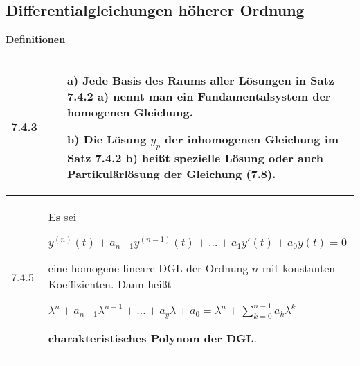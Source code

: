 \subsection{Differentialgleichungen höherer Ordnung}

    \noindent
    \textbf{Definitionen}
    \begin{table}[H]  
    \begin{tabularx}{\textwidth}{X m{16cm}}
        \toprule

        7.4.3 & \begin{itemize}[topsep=-0.5cm]
                    \item[a)] Jede Basis des Raums aller Lösungen in Satz 7.4.2 a) nennt man ein Fundamentalsystem der homogenen Gleichung.
                    \item[b)] Die Lösung $y_p$ der inhomogenen Gleichung im Satz 7.4.2 b) heißt spezielle Lösung oder auch
                                \textbf{Partikulärlösung der Gleichung (7.8)}.
                \end{itemize} \vspace{-0cm} \\
        \midrule
        7.4.5 & Es sei \hfill \break
                \centerline{$ y^{(n)}(t) + a_{n-1}y^{(n-1)}(t) + \dots + a_1y'(t)+a_0y(t)=0 $}
                eine homogene lineare DGL der Ordnung $n$ mit konstanten Koeffizienten. Dann heißt \hfill \break
                \centerline{$ \lambda^n + a_{n-1}\lambda^{n-1}+ \dots + a_y \lambda+a_0 = \lambda^n + \sum^{n-1}_{k=0} a_k \lambda^k $} 
                \textbf{charakteristisches Polynom der DGL}. \\

        \bottomrule

    \end{tabularx}
    \end{table}

